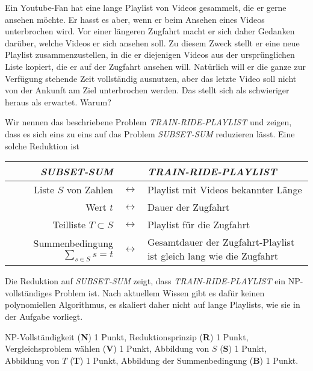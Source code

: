 Ein Youtube-Fan hat eine lange Playlist von Videos gesammelt, die er
gerne ansehen möchte.
Er hasst es aber, wenn er beim Ansehen eines Videos unterbrochen wird.
Vor einer längeren Zugfahrt macht er sich daher Gedanken darüber,
welche Videos er sich ansehen soll.
Zu diesem Zweck stellt er eine neue Playlist zusammenzustellen,
in die er diejenigen Videos aus der ursprünglichen Liste kopiert,
die er auf der Zugfahrt ansehen will.
Natürlich will er die ganze zur Verfügung stehende Zeit vollständig
ausnutzen, aber das letzte Video soll nicht von der Ankunft am Ziel
unterbrochen werden.
Das stellt sich als schwieriger heraus als erwartet. Warum?

\begin{loesung}
Wir nennen das beschriebene Problem {\em TRAIN-RIDE-PLAYLIST} und 
zeigen, dass es sich eins zu eins auf das Problem {\em SUBSET-SUM}
reduzieren lässt.
Eine solche Reduktion ist
\begin{center}
\renewcommand{\arraystretch}{1.3}
\begin{tabular}{r>{$}c<{$}p{8cm}}
{\em SUBSET-SUM}&&{\em TRAIN-RIDE-PLAYLIST}\\
\hline
Liste $S$ von Zahlen
&\leftrightarrow&
Playlist mit Videos bekannter Länge
\\
Wert $t$
&\leftrightarrow&
Dauer der Zugfahrt
\\
Teilliste $T\subset S$
&\leftrightarrow&
Playlist für die Zugfahrt
\\
Summenbedingung $\displaystyle\sum_{s\in S} s = t$
&\leftrightarrow&
Gesamtdauer der Zugfahrt-Playlist ist gleich lang wie die Zugfahrt
\end{tabular}
\end{center}
Die Reduktion auf {\em SUBSET-SUM} zeigt, dass {\em TRAIN-RIDE-PLAYLIST}
ein NP-vollständiges Problem ist.
Nach aktuellem Wissen gibt es dafür keinen polynomiellen Algorithmus,
es skaliert daher nicht auf lange Playlists, wie sie in der Aufgabe
vorliegt.
\end{loesung}

\begin{bewertung}
NP-Vollständigkeit ({\bf N}) 1 Punkt,
Reduktionsprinzip ({\bf R}) 1 Punkt,
Vergleichsproblem wählen ({\bf V}) 1 Punkt,
Abbildung von $S$ ({\bf S}) 1 Punkt,
Abbildung von $T$ ({\bf T}) 1 Punkt,
Abbildung der Summenbedingung ({\bf B}) 1 Punkt.
\end{bewertung}

